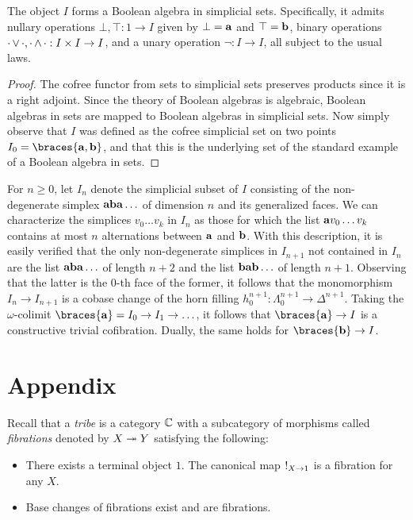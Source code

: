\documentclass[reqno,10pt,a4paper,oneside]{amsart}
\begin{document}
\begin{lemma}
The object $I$ forms a Boolean algebra in simplicial sets.
Specifically, it admits nullary operations $\bot, \top : 1 \to I$ given by $\bot = \mathbf{a}$ and $\top = \mathbf{b}$, binary operations $\mathop{\cdot} \vee \mathop{\cdot}, \mathop{\cdot} \wedge \mathop{\cdot} : I \times I \to I$, and a unary operation $\neg : I \to I$, all subject to the usual laws.
\end{lemma}

\begin{proof}
The cofree functor from sets to simplicial sets preserves products since it is a right adjoint.
Since the theory of Boolean algebras is algebraic, Boolean algebras in sets are mapped to Boolean algebras in simplicial sets.
Now simply observe that $I$ was defined as the cofree simplicial set on two points $I_0 = \braces{\ptA, \ptB}$, and that this is the underlying set of the standard example of a Boolean algebra in sets.
\end{proof}

For $n \geq 0$, let $I_n$ denote the simplicial subset of $I$ consisting of the non-degenerate simplex $\mathbf{a} \mathbf{b} \mathbf{a} \ldots$ of dimension $n$ and its generalized faces.
We can characterize the simplices $v_0 \ldots v_k$ in $I_n$ as those for which the list $\mathbf{a} v_0 \ldots v_k$ contains at most $n$ alternations between $\mathbf{a}$ and $\mathbf{b}$.
With this description, it is easily verified that the only non-degenerate simplices in $I_{n+1}$ not contained in $I_n$ are the list $\mathbf{a} \mathbf{b} \mathbf{a} \ldots$ of length $n+2$ and the list $\mathbf{b} \mathbf{a} \mathbf{b} \ldots$ of length $n+1$.
Observing that the latter is the $0$-th face of the former, it follows that the monomorphism $I_n \to I_{n+1}$ is a cobase change of the horn filling $h_{0}^{n+1} : \Lambda_0^{n+1} \to \Delta^{n+1}$.
Taking the $\omega$-colimit $\braces{\ptA} = I_0 \to I_1 \to \ldots$, it follows that $\braces{\ptA} \to I$ is a constructive trivial cofibration.
Dually, the same holds for $\braces{\ptB} \to I$.

\section{Appendix}

Recall that a \emph{tribe} is a category $\mathbb{C}$ with a subcategory of morphisms called \emph{fibrations} denoted by $X \twoheadrightarrow Y$ satisfying the following:
\begin{itemize}
\item
There exists a terminal object $1$.
The canonical map $\mathord{!}_{X \to 1}$ is a fibration for any $X$.
\item
Base changes of fibrations exist and are fibrations.
\end{itemize}
\end{document}
